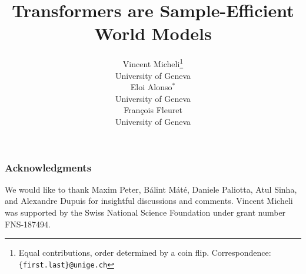 \documentclass{article} %
\title{Transformers are Sample-Efficient \\World Models}
\author{Vincent Micheli\thanks{Equal contributions, order determined by a coin flip. Correspondence: \texttt{\{first.last\}@unige.ch}}\\
    University of Geneva \\
    \And
    Eloi Alonso$^*$ \\
    University of Geneva \\
    \And
    François Fleuret \\
    University of Geneva \\
}
\begin{document}
\maketitle








\newpage



\subsubsection*{Acknowledgments}

We would like to thank Maxim Peter, Bálint Máté, Daniele Paliotta, Atul Sinha, and Alexandre Dupuis for insightful discussions and comments. Vincent Micheli was supported by the Swiss National Science Foundation under grant number FNS-187494.

\newpage




\newpage

\appendix

\end{document}
